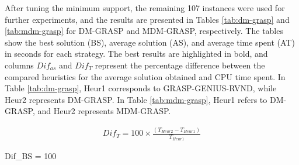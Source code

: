 \documentclass{singlecol-new}
\begin{document}
  After tuning the minimum support, the remaining 107 instances were used for further experiments, and the results are presented in Tables \ref{tab:dm-grasp} and \ref{tab:mdm-grasp} for DM-GRASP and MDM-GRASP, respectively. The tables show the best solution (BS), average solution (AS), and average time spent (AT) in seconds for each strategy. The best results are highlighted in bold, and columns $Dif_{as}$ and $Dif_{T}$ represent the percentage difference between the compared heuristics for the average solution obtained and CPU time spent. In Table \ref{tab:dm-grasp}, Heur1 corresponds to GRASP-GENIUS-RVND, while Heur2 represents DM-GRASP. In Table \ref{tab:mdm-grasp}, Heur1 refers to DM-GRASP, and Heur2 represents MDM-GRASP.





\begin{align}
Dif_{T} = 100 \times \frac{(T_{Heur2} - T_{Heur1})}{T_{Heur1}}
\label{eq:time}
\end{align}



	\begin{flalign}
	Dif_{BS} = 100 \times {}
\label{eq:as}
	\end{flalign}
\end{document}
